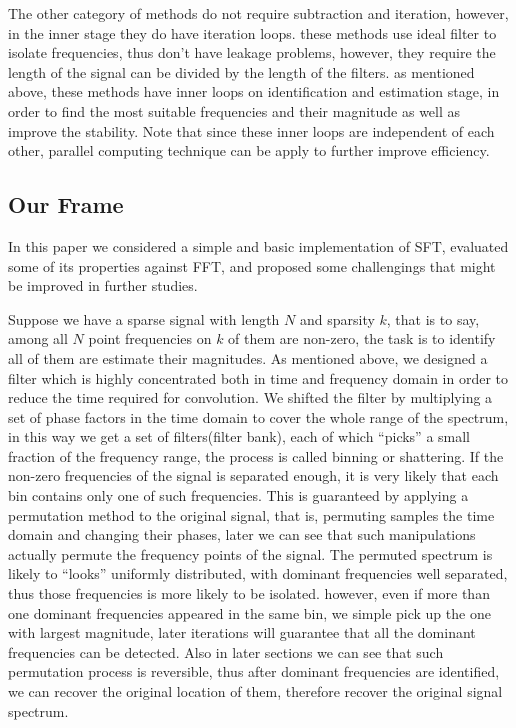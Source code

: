 \documentclass[journal,transmag]{IEEEtran}
\begin{document}
The other category of methods do not require subtraction and iteration, however, in the inner stage they do have iteration loops. these methods use ideal filter to isolate frequencies, thus don’t have leakage problems, however, they require the length of the signal can be divided by the length of the filters. as mentioned above, these methods have inner loops on identification and estimation stage, in order to find the most suitable frequencies and their magnitude as well as improve the stability. Note that since these inner loops are independent of each other, parallel computing technique can be apply to further improve efficiency.


\subsection{Our Frame}
In this paper we considered a simple and basic implementation of SFT, evaluated some of its properties against FFT, and proposed some challengings that might be improved in further studies.

Suppose we have a sparse signal with length $N$ and sparsity $k$, that is to say, among all $N$ point frequencies on $k$ of them are non-zero, the task is to identify all of them are estimate their magnitudes. As mentioned above, we designed a filter which is highly concentrated both in time and frequency domain in order to reduce the time required for convolution. We shifted the filter by multiplying a set of phase factors in the time domain to cover the whole range of the spectrum, in this way we get a set of filters(filter bank), each of which “picks” a small fraction of the frequency range, the process is called binning or shattering. If the non-zero frequencies of the signal is separated enough, it is very likely that each bin contains only one of such frequencies. This is guaranteed by applying a permutation method to the original signal\cite{hassanieh2012simple}, that is, permuting samples the time domain and changing their phases, later we can see that such manipulations actually permute the frequency points of the signal. The permuted spectrum is likely to “looks” uniformly distributed, with dominant frequencies well separated, thus those frequencies is more likely to be isolated. however, even if more than one dominant frequencies appeared in the same bin, we simple pick up the one with largest magnitude, later iterations will guarantee that all the dominant frequencies can be detected. Also in later sections we can see that such permutation process is reversible, thus after dominant frequencies are identified, we can recover the original location of them, therefore recover the original signal spectrum.
\end{document}
